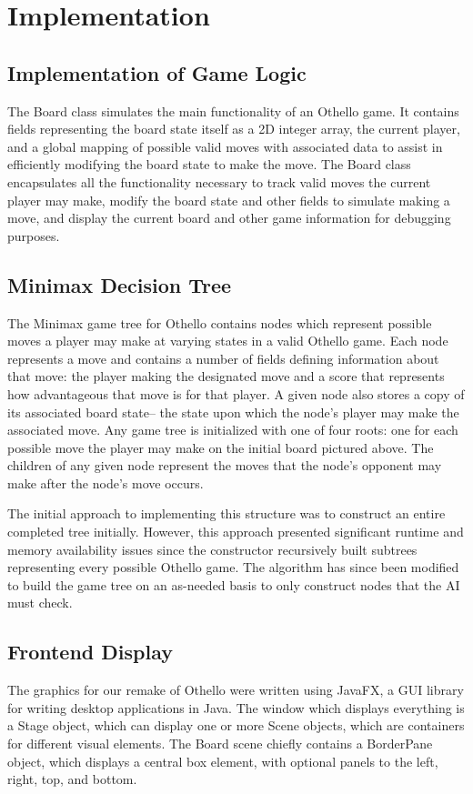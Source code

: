 \documentclass[conference]{IEEEtran}
\begin{document}
\section{Implementation}

\subsection{Implementation of Game Logic}
The Board class simulates the main functionality of an Othello game. It contains fields representing the board state itself as a 2D integer array, the current player, and a global mapping of possible valid moves with associated data to assist in efficiently modifying the board state to make the move. The Board class encapsulates all the functionality necessary to track valid moves the current player may make, modify the board state and other fields to simulate making a move, and display the current board and other game information for debugging purposes.

\subsection{Minimax Decision Tree}
The Minimax game tree for Othello contains nodes which represent possible moves a player may make at varying states in a valid Othello game. Each node represents a move and contains a number of fields defining information about that move: the player making the designated move and a score that represents how advantageous that move is for that player. A given node also stores a copy of its associated board state– the state upon which the node’s player may make the associated move. Any game tree is initialized with one of four roots: one for each possible move the player may make on the initial board pictured above. The children of any given node represent the moves that the node’s opponent may make after the node’s move occurs.

The initial approach to implementing this structure was to construct an entire completed tree initially. However, this approach presented significant runtime and memory availability issues since the constructor recursively built subtrees representing every possible Othello game. The algorithm has since been modified to build the game tree on an as-needed basis to only construct nodes that the AI must check.

\subsection{Frontend Display}
The graphics for our remake of Othello were written using JavaFX, a GUI library for writing desktop applications in Java. The window which displays everything is a Stage object, which can display one or more Scene objects, which are containers for different visual elements. The Board scene chiefly contains a BorderPane object, which displays a central box element, with optional panels to the left, right, top, and bottom.
\end{document}
